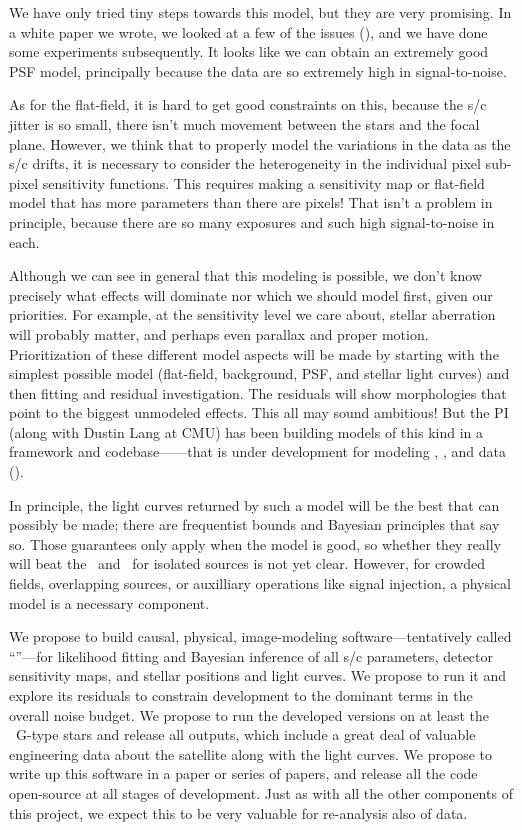 \documentclass[letterpaper,12pt,preprint]{hack_aastex}
\begin{document}
We have only tried tiny steps towards this model, but they are very promising.
In a white paper we wrote, we looked at a few of the issues
(\citealt{whitepaper}),
and we have done some experiments subsequently.
It looks like we can obtain an extremely good PSF model,
principally because the data are so extremely high in signal-to-noise.

As for the flat-field, it is hard to get good constraints on this,
because the s/c jitter is so small, there isn't much movement between the
stars and the focal plane.
However, we think that to properly model the variations in the data as
the s/c drifts, it is necessary to consider the heterogeneity in the individual
pixel sub-pixel sensitivity functions.
This requires making a sensitivity map or flat-field model that has more
parameters than there are pixels!
That isn't a problem in principle, because there are so many exposures
and such high signal-to-noise in each.

Although we can see in general that this modeling is possible, we don't know
precisely what effects will dominate nor which we should model first, given
our priorities.
For example, at the sensitivity level we care about, stellar aberration will
probably matter, and perhaps even parallax and proper motion.
Prioritization of these different model aspects will be made by starting with
the simplest possible model (flat-field, background, PSF, and stellar light
curves) and then fitting and residual investigation.
The residuals will show morphologies that point to the biggest unmodeled
effects.
This all may sound ambitious!
But the PI (along with Dustin Lang at CMU) has been building models of this
kind in a framework and
codebase------that is under development for modeling
, , and  data (\citealt{unwise}).

In principle, the light curves returned by such a model will be the best that
can possibly be made; there are frequentist bounds and Bayesian principles
that say so.
Those guarantees only apply when the model is good, so whether they really
will beat the \PLM\ and \OWL\ for isolated sources is not yet clear.
However, for crowded fields, overlapping sources, or auxilliary operations
like signal injection, a physical model is a necessary component.

We propose to build causal, physical, image-modeling
software---tentatively called ``\kpsf''---for likelihood fitting and Bayesian
inference of all s/c parameters, detector sensitivity maps, and stellar
positions and light curves.
We propose to run it and explore its residuals to constrain development to
the dominant terms in the overall noise budget.
We propose to run the developed versions on at least the \Kepler\ G-type
stars and release all outputs, which include a great deal of valuable
engineering data about the satellite along with the light curves.
We propose to write up this software in a paper or series of papers,
and release all the code open-source at all stages of development.
Just as with all the other components of this project, we expect this to be
very valuable for re-analysis also of  data.
\end{document}
